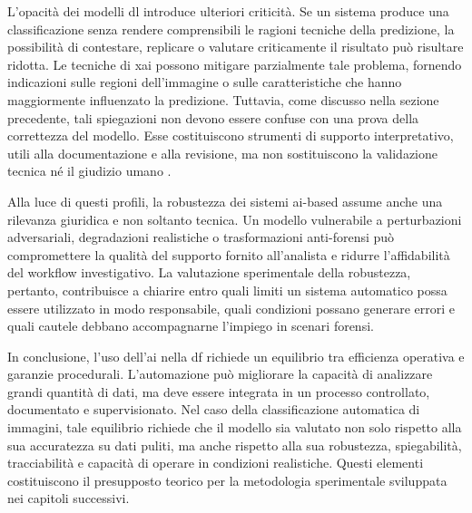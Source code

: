 L'opacità dei modelli \gls{dl} introduce ulteriori criticità. Se un sistema produce una classificazione senza rendere comprensibili le ragioni tecniche della predizione, la possibilità di contestare, replicare o valutare criticamente il risultato può risultare ridotta. Le tecniche di \gls{xai} possono mitigare parzialmente tale problema, fornendo indicazioni sulle regioni dell'immagine o sulle caratteristiche che hanno maggiormente influenzato la predizione. Tuttavia, come discusso nella sezione precedente, tali spiegazioni non devono essere confuse con una prova della correttezza del modello. Esse costituiscono strumenti di supporto interpretativo, utili alla documentazione e alla revisione, ma non sostituiscono la validazione tecnica né il giudizio umano \cite{Adadi2018,Doshi-Velez2017}.

Alla luce di questi profili, la robustezza dei sistemi \gls{ai}-based assume anche una rilevanza giuridica e non soltanto tecnica. Un modello vulnerabile a perturbazioni adversariali, degradazioni realistiche o trasformazioni anti-forensi può compromettere la qualità del supporto fornito all'analista e ridurre l'affidabilità del workflow investigativo. La valutazione sperimentale della robustezza, pertanto, contribuisce a chiarire entro quali limiti un sistema automatico possa essere utilizzato in modo responsabile, quali condizioni possano generare errori e quali cautele debbano accompagnarne l'impiego in scenari forensi.

In conclusione, l'uso dell'\gls{ai} nella \gls{df} richiede un equilibrio tra efficienza operativa e garanzie procedurali. L'automazione può migliorare la capacità di analizzare grandi quantità di dati, ma deve essere integrata in un processo controllato, documentato e supervisionato. Nel caso della classificazione automatica di immagini, tale equilibrio richiede che il modello sia valutato non solo rispetto alla sua accuratezza su dati puliti, ma anche rispetto alla sua robustezza, spiegabilità, tracciabilità e capacità di operare in condizioni realistiche. Questi elementi costituiscono il presupposto teorico per la metodologia sperimentale sviluppata nei capitoli successivi.